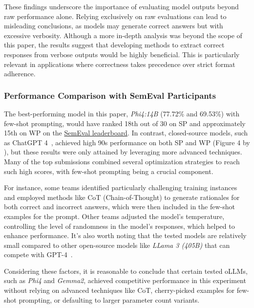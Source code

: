 These findings underscore the importance of evaluating model outputs beyond raw performance alone. Relying exclusively on raw evaluations can lead to misleading conclusions, as models may generate correct answers but with excessive verbosity. Although a more in-depth analysis was beyond the scope of this paper, the results suggest that developing methods to extract correct responses from verbose outputs would be highly beneficial. This is particularly relevant in applications where correctness takes precedence over strict format adherence.

\subsubsection{Performance Comparison with SemEval Participants}

The best-performing model in this paper, \textit{Phi4:14B} (77.72\% and 69.53\%) with few-shot prompting, would have ranked 18th out of 30 on \ac{SP} and approximately 15th on \ac{WP} on the \href{https://brainteasersem.github.io/#leaderboard}{SemEval leaderboard}. In contrast, closed-source models, such as ChatGPT 4~\cite{openaiGPT4TechnicalReport2024}, achieved high 90s performance on both \ac{SP} and \ac{WP} (Figure 4 by \textcite{jiangSemEval2024Task92024}), but these results were only attained by leveraging more advanced techniques. Many of the top submissions combined several optimization strategies to reach such high scores, with few-shot prompting being a crucial component.

For instance, some teams identified particularly challenging training instances and employed methods like \ac{CoT} (Chain-of-Thought) to generate rationales for both correct and incorrect answers, which were then included in the few-shot examples for the prompt. Other teams adjusted the model's temperature, controlling the level of randomness in the model's responses, which helped to enhance performance.  It's also worth noting that the tested models are relatively small compared to other open-source models like \textit{LLama 3 (405B)} that can compete with GPT-4~\cite{grattafioriLlama3Herd2024,openaiGPT4TechnicalReport2024}.

Considering these factors, it is reasonable to conclude that certain tested \acp{oLLM}, such as \textit{Phi4} and \textit{Gemma2}, achieved competitive performance in this experiment without relying on advanced techniques like \ac{CoT}, cherry-picked examples for few-shot prompting, or defaulting to larger parameter count variants.

